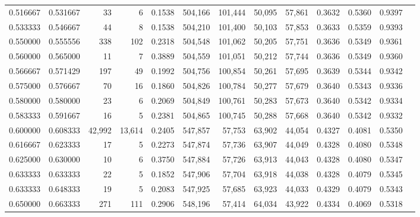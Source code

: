 \begin{tabular}{rrrrrrrrrrrrr}
0.516667 & 0.531667 &     33 &      6 &                                     0.1538 & 504,166 & 101,444 &  50,095 &  57,861 & 0.3632 & 0.5360 & 0.9397 \\
0.533333 & 0.546667 &     44 &      8 &                                     0.1538 & 504,210 & 101,400 &  50,103 &  57,853 & 0.3633 & 0.5359 & 0.9393 \\
0.550000 & 0.555556 &    338 &    102 &                                     0.2318 & 504,548 & 101,062 &  50,205 &  57,751 & 0.3636 & 0.5349 & 0.9361 \\
0.560000 & 0.565000 &     11 &      7 &                                     0.3889 & 504,559 & 101,051 &  50,212 &  57,744 & 0.3636 & 0.5349 & 0.9360 \\
0.566667 & 0.571429 &    197 &     49 &                                     0.1992 & 504,756 & 100,854 &  50,261 &  57,695 & 0.3639 & 0.5344 & 0.9342 \\
0.575000 & 0.576667 &     70 &     16 &                                     0.1860 & 504,826 & 100,784 &  50,277 &  57,679 & 0.3640 & 0.5343 & 0.9336 \\
0.580000 & 0.580000 &     23 &      6 &                                     0.2069 & 504,849 & 100,761 &  50,283 &  57,673 & 0.3640 & 0.5342 & 0.9334 \\
0.583333 & 0.591667 &     16 &      5 &                                     0.2381 & 504,865 & 100,745 &  50,288 &  57,668 & 0.3640 & 0.5342 & 0.9332 \\
0.600000 & 0.608333 & 42,992 & 13,614 &                                     0.2405 & 547,857 &  57,753 &  63,902 &  44,054 & 0.4327 & 0.4081 & 0.5350 \\
0.616667 & 0.623333 &     17 &      5 &                                     0.2273 & 547,874 &  57,736 &  63,907 &  44,049 & 0.4328 & 0.4080 & 0.5348 \\
0.625000 & 0.630000 &     10 &      6 &                                     0.3750 & 547,884 &  57,726 &  63,913 &  44,043 & 0.4328 & 0.4080 & 0.5347 \\
0.633333 & 0.633333 &     22 &      5 &                                     0.1852 & 547,906 &  57,704 &  63,918 &  44,038 & 0.4328 & 0.4079 & 0.5345 \\
0.633333 & 0.648333 &     19 &      5 &                                     0.2083 & 547,925 &  57,685 &  63,923 &  44,033 & 0.4329 & 0.4079 & 0.5343 \\
0.650000 & 0.663333 &    271 &    111 &                                     0.2906 & 548,196 &  57,414 &  64,034 &  43,922 & 0.4334 & 0.4069 & 0.5318 \\

\end{tabular}
